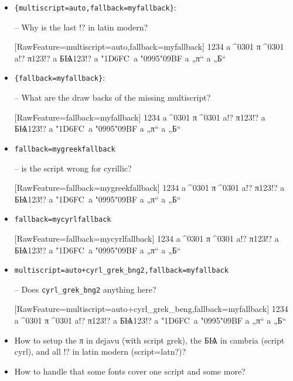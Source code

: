 \documentclass{article}
\newcommand\testtext{1234 a^^^^0301 π^^^^0301 a!? π123!? a БѨ123!? a \char"1D6FC\ a \char"0995\char"09BF a „π“ a „Б“}
\begin{document}
\begin{itemize}
\item \verb+{multiscript=auto,fallback=myfallback}+:

-- Why is the last !? in latin modern?

[RawFeature={multiscript=auto,fallback=myfallback}]
\testtext

\item \verb+{fallback=myfallback}+:

-- What are the draw backs of the missing multiscript?

[RawFeature={fallback=myfallback}]
\testtext

\item \verb+fallback=mygreekfallback+

-- is the script wrong for cyrillic?

[RawFeature={fallback=mygreekfallback}]
\testtext

\item \verb+fallback=mycyrlfallback+

[RawFeature={fallback=mycyrlfallback}]
\testtext

\item \verb!multiscript=auto+cyrl_grek_bng2,fallback=myfallback!

-- Does \verb+cyrl_grek_bng2+ anything here?

[RawFeature={multiscript=auto+cyrl_grek_beng,fallback=myfallback}]
\testtext


\item How to setup the π in dejavu (with script grek), the БѨ in cambria (script cyrl), and all !? in latin modern (script=latn?)?

\item How to handle that some fonts cover one script and some more?
\end{itemize}
\end{document}
